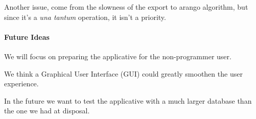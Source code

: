 \documentclass[11pt,twocolumn]{article}
\begin{document}
Another issue, come from the slowness of the export to arango algorithm, but since it's a \textit{una tantum} operation, it isn't a priority. 

\paragraph{Future Ideas}

We will focus on preparing the applicative for the non-programmer user.

We think a Graphical User Interface (GUI) could greatly smoothen the user experience.

In the future we want to test the applicative with a much larger database than the one we had at disposal.

\twocolumn[
\begin{@twocolumnfalse}


\end{@twocolumnfalse}
]
\end{document}
